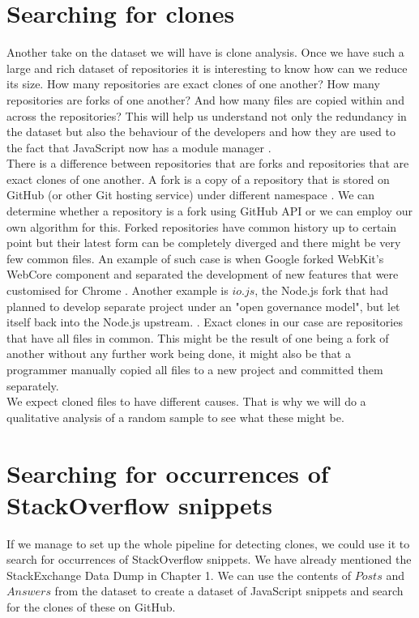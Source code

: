 \documentclass[thesis=M,english]{FITthesis}[2012/10/20]
\begin{document}
\section{Searching for clones}

Another take on the dataset we will have is clone analysis. Once we have such a large and rich dataset of repositories it is interesting to know how can we reduce its size. How many repositories are exact clones of one another? How many repositories are forks of one another? And how many files are copied within and across the repositories? This will help us understand not only the redundancy in the dataset but also the behaviour of the developers and how they are used to the fact that JavaScript now has a module manager \cite{npm}. \\

There is a difference between repositories that are forks and repositories that are exact clones of one another. A fork is a copy of a repository that is stored on GitHub (or other Git hosting service) under different namespace \cite{gh_forks}. We can determine whether a repository is a fork using GitHub API or we can employ our own algorithm for this.  Forked repositories have common history up to certain point but their latest form can be completely diverged and there might be very few common files. An example of such case is when Google forked WebKit's WebCore component and separated the development of new features that were customised for Chrome \cite{blink}. Another example is $io.js$, the Node.js fork that had planned to develop separate project under an "open governance model", but let itself back into the Node.js upstream. \cite{iojs, iojs2, iojs3}. Exact clones in our case are repositories that have all files in common. This might be the result of one being a fork of another without any further work being done, it might also be that a programmer manually copied all files to a new project and committed them separately. \\

We expect cloned files to have different causes. That is why we will do a qualitative analysis of a random sample to see what these might be. \\

\section{Searching for occurrences of StackOverflow snippets}

If we manage to set up the whole pipeline for detecting clones, we could use it to search for occurrences of StackOverflow snippets. We have already mentioned the StackExchange Data Dump in Chapter 1. We can use the contents of $Posts$ and $Answers$ from the dataset to create a dataset of JavaScript snippets and search for the clones of these on GitHub.
\end{document}
